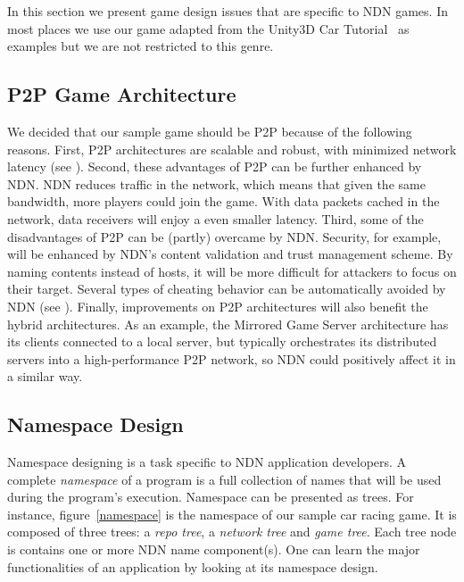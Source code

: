 \documentclass{sigchi}
\begin{document}
In this section we present game design issues that are specific to NDN games. In most places we use our game adapted from the Unity3D Car Tutorial~\cite{UnityCar} as examples but we are not restricted to this genre.


\subsection{P2P Game Architecture}

We decided that our sample game should be P2P because of the following reasons. First, P2P architectures are scalable and robust, with minimized network latency (see ). Second, these advantages of P2P can be further enhanced by NDN. NDN reduces traffic in the network, which means that given the same bandwidth, more players could join the game. With data packets cached in the network, data receivers will enjoy a even smaller latency. Third, some of the disadvantages of P2P can be (partly) overcame by NDN. Security, for example, will be enhanced by NDN's content validation and trust management scheme. By naming contents instead of hosts, it will be more difficult for attackers to focus on their target. Several types of cheating behavior can be automatically avoided by NDN (see ). Finally, improvements on P2P architectures will also benefit the hybrid architectures. As an example, the Mirrored Game Server architecture has its clients connected to a local server, but typically orchestrates its distributed servers into a high-performance P2P network, so NDN could positively affect it in a similar way.


\subsection{Namespace Design}

Namespace designing is a task specific to NDN application developers. A complete \emph{namespace} of a program is a full collection of names that will be used during the program's execution. Namespace can be presented as trees. For instance, figure~\ref{namespace} is the namespace of our sample car racing game. It is composed of three trees: a \emph{repo tree}, a \emph{network tree} and \emph{game tree}. Each tree node is contains one or more NDN name component(s). One can learn the major functionalities of an application by looking at its namespace design.
\end{document}
